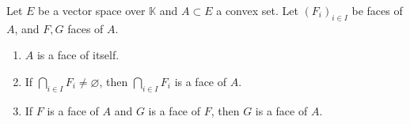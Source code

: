 Let $E$ be a vector space over $\mathbb{K}$ and $A \subset E$ a convex set. Let $(F_i)_{i \in I}$ be faces of $A$, and $F, G$ faces of $A$.

\begin{enumerate}
  \item $A$ is a face of itself.
  \item If $\bigcap_{i \in I} F_i \neq \varnothing$, then $\bigcap_{i \in I} F_i$ is a face of $A$.
  \item If $F$ is a face of $A$ and $G$ is a face of $F$, then $G$ is a face of $A$.
\end{enumerate}
